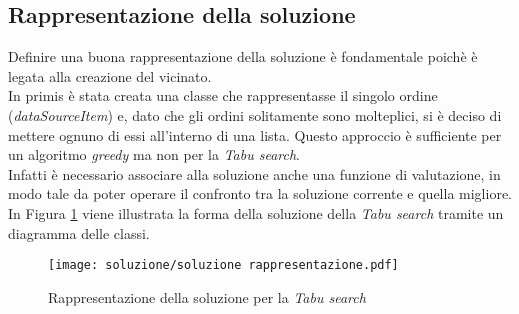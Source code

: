 \subsection{Rappresentazione della soluzione}
\label{sec:rappresentazione-della-soluzione}
\noindent Definire una buona rappresentazione della soluzione è fondamentale
poichè è legata alla creazione del vicinato.\\
In primis è stata creata una classe che rappresentasse
il singolo ordine (\textit{dataSourceItem}) e, dato che gli ordini solitamente sono molteplici,
si è deciso di mettere ognuno di essi all'interno di una lista.
Questo approccio è sufficiente per un algoritmo \textit{greedy} ma non per la \textit{Tabu search}.\\
Infatti è necessario associare alla soluzione anche una funzione di valutazione, in modo tale
da poter operare il confronto tra la soluzione corrente e quella migliore.\\
In Figura \ref{rappresentazione-soluzione} viene illustrata la forma della soluzione della \textit{Tabu search} tramite un diagramma delle classi. \cite{site:rcardin}
\begin{figure}[!h] 
    \centering 
    \texttt{[image: soluzione/soluzione rappresentazione.pdf]} 
    \caption{Rappresentazione della soluzione per la \textit{Tabu search}}
    \label{rappresentazione-soluzione}
\end{figure}

